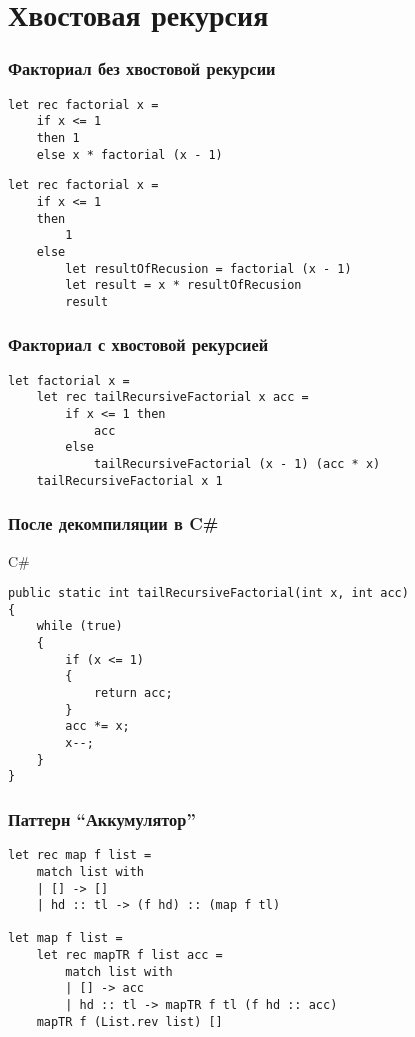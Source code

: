 \documentclass[xetex,mathserif,serif]{beamer}
\begin{document}
	\section{Хвостовая рекурсия}

	\begin{frame}[fragile]
		\frametitle{Факториал без хвостовой рекурсии}
		\begin{verbatim}
let rec factorial x =
    if x <= 1
    then 1 
    else x * factorial (x - 1)
		\end{verbatim}

		\begin{verbatim}
let rec factorial x =
    if x <= 1
    then
        1
    else
        let resultOfRecusion = factorial (x - 1)
        let result = x * resultOfRecusion
        result
		\end{verbatim}
	\end{frame}

	\begin{frame}[fragile]
		\frametitle{Факториал с хвостовой рекурсией}
		\begin{verbatim}
let factorial x =
    let rec tailRecursiveFactorial x acc =
        if x <= 1 then
            acc
        else
            tailRecursiveFactorial (x - 1) (acc * x)
    tailRecursiveFactorial x 1
		\end{verbatim}
	\end{frame}
	
	\begin{frame}[fragile]
		\frametitle{После декомпиляции в C\#}
		\begin{alertblock}{C\#}
			\begin{verbatim}
public static int tailRecursiveFactorial(int x, int acc)
{
    while (true)
    {
        if (x <= 1)
        {
            return acc;
        }
        acc *= x;
        x--;
    }
}
			\end{verbatim}
		\end{alertblock}
	\end{frame}

	\begin{frame}[fragile]
		\frametitle{Паттерн ``Аккумулятор''}
		\begin{verbatim}
let rec map f list =
    match list with
    | [] -> []
    | hd :: tl -> (f hd) :: (map f tl)

let map f list =
    let rec mapTR f list acc =
        match list with
        | [] -> acc
        | hd :: tl -> mapTR f tl (f hd :: acc)
    mapTR f (List.rev list) []
		\end{verbatim}
	\end{frame}
\end{document}
